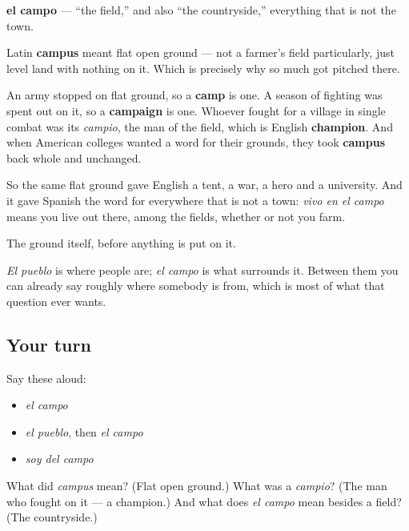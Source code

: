 \begin{cousinweb}
\textbf{el campo} — \textquotedblleft{}the field,\textquotedblright{} and also \textquotedblleft{}the countryside,\textquotedblright{} everything that is not the town.

Latin \textbf{campus} meant flat open ground — not a farmer's field particularly, just level land with nothing on it. Which is precisely why so much got pitched there.

An army stopped on flat ground, so a \textbf{camp} is one. A season of fighting was spent out on it, so a \textbf{campaign} is one. Whoever fought for a village in single combat was its \emph{campio}, the man of the field, which is English \textbf{champion}. And when American colleges wanted a word for their grounds, they took \textbf{campus} back whole and unchanged.

So the same flat ground gave English a tent, a war, a hero and a university. And it gave Spanish the word for everywhere that is not a town: \emph{vivo en el campo} means you live out there, among the fields, whether or not you farm.
\end{cousinweb}

\begin{grammarlens}[title={What you've built}]
The ground itself, before anything is put on it.

\emph{El pueblo} is where people are; \emph{el campo} is what surrounds it. Between them you can already say roughly where somebody is from, which is most of what that question ever wants.
\end{grammarlens}

\subsection*{Your turn}
Say these aloud:

\begin{itemize}
\raggedright
  \item \emph{el campo}
  \item \emph{el pueblo}, then \emph{el campo}
  \item \emph{soy del campo}
\end{itemize}

\begin{tcolorbox}[breakable,colback=teal!4,colframe=teal!35!black,title={Before you move on}]
What did \emph{campus} mean? (Flat open ground.) What was a \emph{campio}? (The man who fought on it — a champion.) And what does \emph{el campo} mean besides a field? (The countryside.)
\end{tcolorbox}
